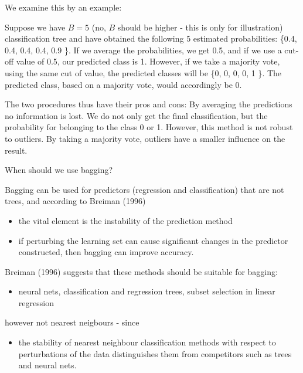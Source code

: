 \documentclass[ignorenonframetext,]{beamer}
\providecommand{\tightlist}{%
  \setlength{\itemsep}{0pt}\setlength{\parskip}{0pt}}
\begin{document}
\begin{frame}

We examine this by an example:

Suppose we have \(B=5\) (no, \(B\) should be higher - this is only for
illustration) classification tree and have obtained the following 5
estimated probabilities: \{0.4, 0.4, 0.4, 0.4, 0.9 \}. If we average the
probabilities, we get 0.5, and if we use a cut-off value of 0.5, our
predicted class is 1. However, if we take a majority vote, using the
same cut of value, the predicted classes will be \{0, 0, 0, 0, 1 \}. The
predicted class, based on a majority vote, would accordingly be 0.

The two procedures thus have their pros and cons: By averaging the
predictions no information is lost. We do not only get the final
classification, but the probability for belonging to the class 0 or 1.
However, this method is not robust to outliers. By taking a majority
vote, outliers have a smaller influence on the result.

\end{frame}

\begin{frame}

\begin{block}{When should we use bagging?}

Bagging can be used for predictors (regression and classification) that
are not trees, and according to Breiman (1996)

\begin{itemize}
\tightlist
\item
  the vital element is the instability of the prediction method
\item
  if perturbing the learning set can cause significant changes in the
  predictor constructed, then bagging can improve accuracy.
\end{itemize}

Breiman (1996) suggests that these methods should be suitable for
bagging:

\begin{itemize}
\tightlist
\item
  neural nets, classification and regression trees, subset selection in
  linear regression
\end{itemize}

however not nearest neigbours - since

\begin{itemize}
\tightlist
\item
  the stability of nearest neighbour classification methods with respect
  to perturbations of the data distinguishes them from competitors such
  as trees and neural nets.
\end{itemize}

\end{block}

\end{frame}
\end{document}
